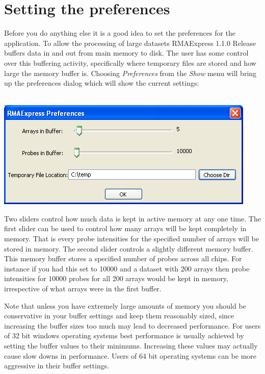 \documentclass[11pt]{report}
\newcommand{\curversion}{1.1.0 Release }
\begin{document}
\section{Setting the preferences}

Before you do anything else it is a good idea to set the preferences for the application. To allow the processing of large datasets RMAExpress \curversion buffers data in and out from main memory to disk. The user has some control over this buffering activity, specifically where temporary files are stored and how large the memory buffer is. Choosing {\it Preferences} from the {\it Show} menu will bring up the preferences dialog which will show the current settings: \\ \\
\begin{center}
\includegraphics[scale=0.5]{preferenceswindow}
\end{center}
Two sliders control how much data is kept in active memory at any one time. The first slider can be used to control how many arrays will be kept completely in memory. That is every probe intensities for the specified number of arrays will be stored in memory. The second slider controls a slightly different memory buffer. This memory buffer stores a specified number of probes across all chips. For instance if you had this set to 10000 and a dataset with 200 arrays then probe intensities for 10000 probes for all 200 arrays would be kept in memory, irrespective of what arrays were in the first buffer. 


Note that unless you have extremely large amounts of memory you should be conservative in your buffer settings and keep them reasonably sized, since increasing the buffer sizes too much may lead to decreased performance. For users of 32 bit windows operating systems best performance is usually achieved by setting the buffer values to their minimums. Increasing these values may actually cause slow downs in performance. Users of 64 bit operating systems can be more aggressive in their buffer settings.
\end{document}
